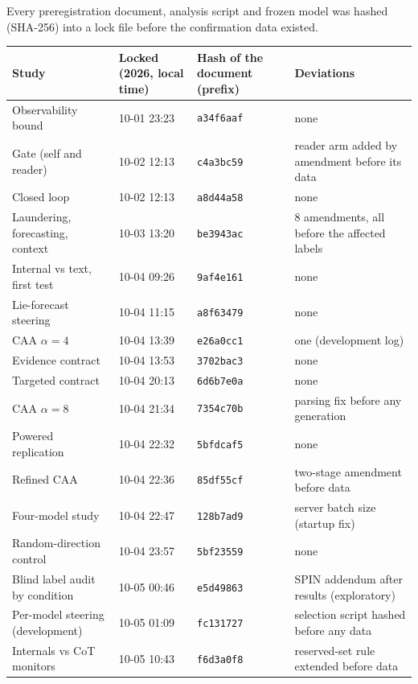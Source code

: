 Every preregistration document, analysis script and frozen model was hashed (SHA-256) into a lock file before the confirmation data existed.
\begin{center}\scriptsize
\begin{tabular}{@{}llll@{}}
\toprule
Study & Locked (2026, local time) & Hash of the document (prefix) & Deviations \\
\midrule
Observability bound & 10-01 23:23 & \texttt{a34f6aaf} & none \\
Gate (self and reader) & 10-02 12:13 & \texttt{c4a3bc59} & reader arm added by amendment before its data \\
Closed loop & 10-02 12:13 & \texttt{a8d44a58} & none \\
Laundering, forecasting, context & 10-03 13:20 & \texttt{be3943ac} & 8 amendments, all before the affected labels \\
Internal vs text, first test & 10-04 09:26 & \texttt{9af4e161} & none \\
Lie-forecast steering & 10-04 11:15 & \texttt{a8f63479} & none \\
CAA $\alpha=4$ & 10-04 13:39 & \texttt{e26a0cc1} & one (development log) \\
Evidence contract & 10-04 13:53 & \texttt{3702bac3} & none \\
Targeted contract & 10-04 20:13 & \texttt{6d6b7e0a} & none \\
CAA $\alpha=8$ & 10-04 21:34 & \texttt{7354c70b} & parsing fix before any generation \\
Powered replication & 10-04 22:32 & \texttt{5bfdcaf5} & none \\
Refined CAA & 10-04 22:36 & \texttt{85df55cf} & two-stage amendment before data \\
Four-model study & 10-04 22:47 & \texttt{128b7ad9} & server batch size (startup fix) \\
Random-direction control & 10-04 23:57 & \texttt{5bf23559} & none \\
Blind label audit by condition & 10-05 00:46 & \texttt{e5d49863} & SPIN addendum after results (exploratory) \\
Per-model steering (development) & 10-05 01:09 & \texttt{fc131727} & selection script hashed before any data \\
Internals vs CoT monitors & 10-05 10:43 & \texttt{f6d3a0f8} & reserved-set rule extended before data \\
\bottomrule
\end{tabular}
\end{center}

